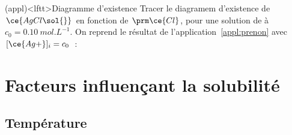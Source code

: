 \documentclass[../../main/main.tex]{subfiles}
\begin{document}
\begin{tcb*}(appl)<lftt>{Diagramme d'existence }
	Tracer le diagramem d'existence de $\ce{AgCl\sol{}}$ en fonction de $\prm
		\ce{Cl}$, pour une solution de  à $c_0 = \SI{0.10}{mol.L^{-1}}$.
	\tcblower
	On reprend le résultat de l'application~\ref{appl:prenon} avec $[\ce{Ag+}]_i =
		c_0$~:
	\vspace{-15pt}
	\begin{center}
	\end{center}
\end{tcb*}

\section{Facteurs influençant la solubilité}
\subsection{Température}
\end{document}
